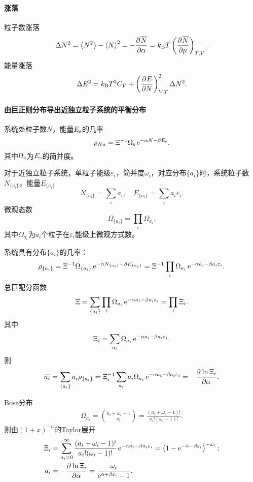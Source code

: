 \paragraph{涨落}
粒子数涨落
\begin{align}
	\Delta N^2=\left\langle N^2\right\rangle-\left\langle N\right\rangle^2=-\frac{\partial^{{}}\overline{N}}{\partial{\alpha}^{{}}}=k_{\mathrm B} T\left(\frac{\partial^{{}}\overline{N}}{\partial{\mu}^{{}}}\right)_{T,V}.
\end{align}
能量涨落
\begin{align}
	\Delta E^2=k_{\mathrm B} T^2C_V+\left(\frac{\partial^{{}}E}{\partial{N}^{{}}}\right)_{V,T}^2\Delta N^2.
\end{align}
\paragraph{由巨正则分布导出近独立粒子系统的平衡分布}系统处粒子数$N$，能量$E_\mathrm s$的几率
\[
	\rho_{Na}=\Xi^{-1}\Omega_\mathrm s\mathop{}\!\mathrm{e}^{-\alpha N-\beta E_\mathrm s}.
\]
其中$\Omega_\mathrm s$为$E_\mathrm s$的简并度。

对于近独立粒子系统，单粒子能级$\varepsilon_i$，简并度$\omega_i$，对应分布$\{a_i\}$时，系统粒子数$N_{\{a_i\}}$，能量$E_{\{a_i\}}$
\[
	N_{\{a_i\}}=\sum_ia_i,\quad E_{\{a_i\}}=\sum_ia_i\varepsilon_i.
\]
微观态数
\[
	\Omega_{\{a_i\}}=\prod_i\Omega_{a_i}.
\]
其中$\Omega_{a_i}$为$a_i$个粒子在$\varepsilon_i$能级上微观方式数。

系统具有分布$\{a_i\}$的几率：
\[
	\rho_{\{a_i\}}=\Xi^{-1}\Omega_{\{a_i\}}\mathop{}\!\mathrm{e}^{-\alpha N_{\{a_i\}}-\beta E_{\{a_i\}}}=\Xi^{-1}\prod_i\Omega_{a_i}\mathop{}\!\mathrm{e}^{-\alpha{a_i}-\beta{a_i\varepsilon_i}}.
\]
总巨配分函数
\[
	\Xi=\sum_{\{a_i\}}\prod_i\Omega_{a_i}\mathop{}\!\mathrm{e}^{-\alpha{a_i}-\beta{a_i\varepsilon_i}}=\prod_i\Xi_i.
\]
其中 
\[
	\Xi_i=\sum_{a_i}\Omega_{a_i}\mathop{}\!\mathrm{e}^{-\alpha{a_i}-\beta{a_i\varepsilon_i}}.
\]
则
\begin{align*}
	\overline{a_i}=\sum_{\{a_i\}}a_i\rho_{\{a_i\}}=\Xi_i^{-1}\sum_{a_i}a_i\Omega_{a_i}\mathop{}\!\mathrm{e}^{-\alpha{a_i}-\beta{a_i\varepsilon_i}}=-\frac{\partial^{{}}\ln\Xi_i}{\partial{\alpha}^{{}}}.
\end{align*}

Bose分布
\begin{align}
	\Omega_{a_i}=\binom{a_i+\omega_i-1}{a_i}=\frac{(a_i+\omega_i-1)!}{a_i!(\omega_i-1)!}.
\end{align}
则由$(1+x)^{-n}$的Taylor展开
\begin{align}
	\Xi_i&=\sum_{a_i=0}^\infty\frac{(a_i+\omega_i-1)!}{a_i!(\omega_i-1)!}\mathop{}\!\mathrm{e}^{-\alpha a_i-\beta a_i\varepsilon_i}=\left(1-\mathop{}\!\mathrm{e}^{-\alpha-\beta\varepsilon_i}\right)^{-\omega_i};\\
	a_i&=-\frac{\partial^{{}}\ln\Xi_i}{\partial{\alpha}^{{}}}=\frac{\omega_i}{\mathop{}\!\mathrm{e}^{\alpha+\beta\varepsilon_i}-1}.
\end{align}

